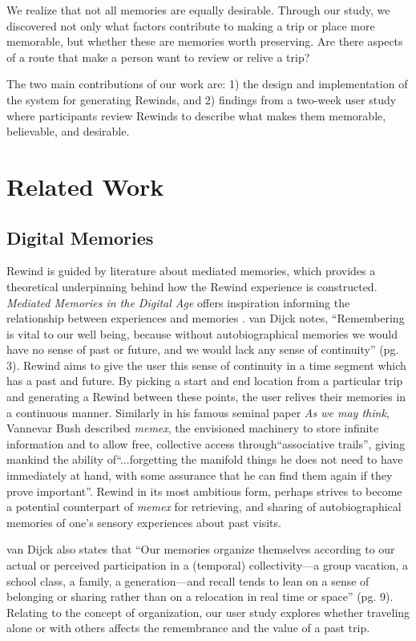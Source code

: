 \documentclass{sigchi}
\begin{document}
We realize that not all memories are equally desirable. Through our study, we discovered not only what factors contribute to making a trip or place more memorable, but whether these are memories worth preserving. Are there aspects of a route that make a person want to review or relive a trip?
 
The two main contributions of our work are: 1) the design and implementation of the system for generating Rewinds, and 2) findings from a two-week user study where participants review Rewinds to describe what makes them memorable, believable, and desirable.

\section{Related Work}
\subsection{Digital Memories}
Rewind is guided by literature about mediated memories, which provides a theoretical underpinning behind how the Rewind experience is constructed. \textit{Mediated Memories in the Digital Age} offers inspiration informing the relationship between experiences and memories \cite{van2007mediated}. van Dijck notes, ``Remembering is vital to our well being, because without autobiographical memories we would have no sense of past or future, and we would lack any sense of continuity'' (pg. 3). Rewind aims to give the user this sense of continuity in a time segment which has a past and future. By picking a start and end location from a particular trip and generating a Rewind between these points, the user relives their memories in a continuous manner. Similarly in his famous seminal paper \textit{As we may think}, Vannevar Bush described \textit{memex}, the envisioned machinery to store infinite information and to allow free, collective access through``associative trails'', giving mankind the ability of``...forgetting the manifold things he does not need to have immediately at hand, with some assurance that he can find them again if they prove important''. Rewind in its most ambitious form, perhaps strives to become a potential counterpart of \textit{memex} for retrieving, and sharing of autobiographical memories of one’s sensory experiences about past visits.

van Dijck also states that ``Our memories organize themselves according to our actual or perceived participation in a (temporal) collectivity---a group vacation, a school class, a family, a generation---and recall tends to lean on a sense of belonging or sharing rather than on a relocation in real time or space'' (pg. 9). Relating to the concept of organization, our user study explores whether traveling alone or with others affects the remembrance and the value of a past trip. 
\end{document}
